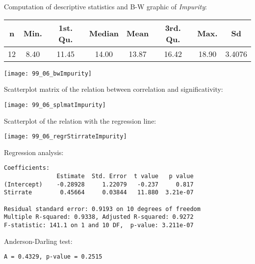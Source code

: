 \begin{frame}
  Computation of descriptive statistics and B-W graphic of \textit{Impurity}:\\
  \vspace{.3cm}
  \begin{scriptsize}
    \begin{center}
      \begin{tabular}{|c|cccccc|c|}
        \hline
        \textbf{n} & \textbf{Min.} & \textbf{1st. Qu.} & \textbf{Median} & \textbf{Mean} & \textbf{3rd. Qu.} & \textbf{Max.} & \textbf{Sd}\\
        \hline
        12 & 8.40 & 11.45 & 14.00 & 13.87 & 16.42 & 18.90 & 3.4076\\
        \hline	
      \end{tabular}
    \end{center}
    \vspace{0.3cm}
    \begin{center}
      \texttt{[image: 99\_06\_bwImpurity]}
    \end{center}
  \end{scriptsize}
\end{frame}

\begin{frame}
  Scatterplot matrix of the relation between correlation and significativity: \\
  \begin{center}
    \texttt{[image: 99\_06\_splmatImpurity]}
  \end{center}
\end{frame}

\begin{frame}
  Scatterplot of the relation with the regression line:\\
  \vspace{.3cm}
  \begin{center}
    \texttt{[image: 99\_06\_regrStirrateImpurity]}
  \end{center}
\end{frame}

\begin{frame}[fragile]
  Regression analysis:\\
  \begin{small}
    \begin{verbatim}
Coefficients:
               Estimate  Std. Error  t value   p value    
(Intercept)    -0.28928     1.22079   -0.237     0.817
Stirrate        0.45664     0.03844   11.880  3.21e-07

Residual standard error: 0.9193 on 10 degrees of freedom
Multiple R-squared: 0.9338,	Adjusted R-squared: 0.9272 
F-statistic: 141.1 on 1 and 10 DF,  p-value: 3.211e-07
    \end{verbatim}
  \end{small}
  Anderson-Darling test:\\
  \begin{small}
    \begin{verbatim}
A = 0.4329, p-value = 0.2515
    \end{verbatim}
  \end{small}
\end{frame}

